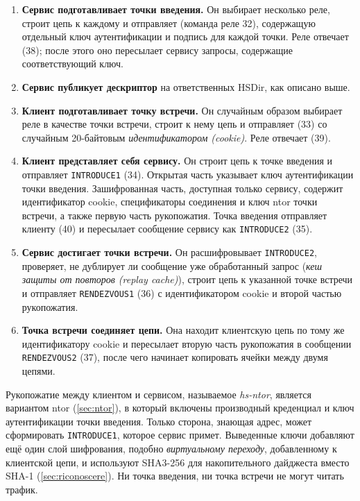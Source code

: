 \begin{enumerate}
  \item \textbf{Сервис подготавливает точки введения.} Он выбирает несколько реле, строит цепь к каждому и отправляет  (команда реле 32), содержащую отдельный ключ аутентификации и подпись для каждой точки. Реле отвечает  (38); после этого оно пересылает сервису запросы, содержащие соответствующий ключ.
  \item \textbf{Сервис публикует дескриптор} на ответственных HSDir, как описано выше.
  \item \textbf{Клиент подготавливает точку встречи.} Он случайным образом выбирает реле в качестве точки встречи, строит к нему цепь и отправляет  (33) со случайным 20-байтовым \emph{идентификатором (cookie)}. Реле отвечает  (39).
  \item \textbf{Клиент представляет себя сервису.} Он строит цепь к точке введения и отправляет \texttt{INTRODUCE1} (34). Открытая часть указывает ключ аутентификации точки введения. Зашифрованная часть, доступная только сервису, содержит идентификатор cookie, спецификаторы соединения и ключ ntor точки встречи, а также первую часть рукопожатия. Точка введения отправляет клиенту  (40) и пересылает сообщение сервису как \texttt{INTRODUCE2} (35).
  \item \textbf{Сервис достигает точки встречи.} Он расшифровывает \texttt{INTRODUCE2}, проверяет, не дублирует ли сообщение уже обработанный запрос (\emph{кеш защиты от повторов (replay cache)}), строит цепь к указанной точке встречи и отправляет \texttt{RENDEZVOUS1} (36) с идентификатором cookie и второй частью рукопожатия.
  \item \textbf{Точка встречи соединяет цепи.} Она находит клиентскую цепь по тому же идентификатору cookie и пересылает вторую часть рукопожатия в сообщении \texttt{RENDEZVOUS2} (37), после чего начинает копировать ячейки между двумя цепями.
\end{enumerate}

Рукопожатие между клиентом и сервисом, называемое \emph{hs-ntor}, является вариантом ntor (\cref{sec:ntor}), в который включены производный креденциал и ключ аутентификации точки введения. Только сторона, знающая адрес, может сформировать \texttt{INTRODUCE1}, которое сервис примет. Выведенные ключи добавляют ещё один слой шифрования, подобно \emph{виртуальному переходу}, добавленному к клиентской цепи, и используют SHA3-256 для накопительного дайджеста вместо SHA-1 (\cref{sec:riconoscere}). Ни точка введения, ни точка встречи не могут читать трафик.

